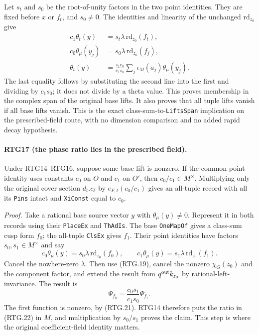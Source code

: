 Let $s_t$ and $s_0$ be the root-of-unity factors in the two point
identities.  They are fixed before $x$ or $f_t$, and $s_0\ne0$.
The identities and linearity of the unchanged $\mathrm{rd}_{z_0}$ give
\[
 \begin{split}
 c_1\theta_t(y)&=s_t\lambda\,\mathrm{rd}_{z_0}(f_t),\\
 c_0\theta_\mu(y_j)&=s_0\lambda\,\mathrm{rd}_{z_0}(f_j),\\
 \theta_t(y)&=
   \frac{s_tc_0}{c_1s_0}\sum_j\iota_M(a_j)\theta_\mu(y_j).
 \end{split}                                                  \tag{RTG.20}
\]
The last equality follows by substituting the second line into the
first and dividing by $c_1s_0$; it does not divide by a theta value.
This proves membership in the complex span of the original base lifts.
It also proves that all tuple lifts vanish if all base lifts vanish.
This is the exact class-sum-to-\texttt{LiftsSpan} implication on the
prescribed-field route, with no dimension comparison and no added rapid
decay hypothesis.

\paragraph{RTG17 (the phase ratio lies in the prescribed field).}
\label{claim:RTG17}
Under RTG14--RTG16, suppose some base lift is nonzero.  If the common
point identity uses constants $c_0$ on $O$ and $c_1$ on $O'$, then
\(c_0/c_1\in M^\times\).  Multiplying only the original cover section
$d_t.c_\delta$ by $e_{F,t}(c_0/c_1)$ gives an all-tuple record with
all its \texttt{Pins} intact and \texttt{XiConst} equal to $c_0$.

\emph{Proof.}
Take a rational base source vector $y$ with $\theta_\mu(y)\ne0$.
Represent it in both records using their \texttt{PlaceEx} and
\texttt{ThAdIs}.  The base \texttt{OneMapOf} gives a class-sum cusp
form $f_0$; the all-tuple \texttt{ClsEx} gives $f_1$.  Their point
identities have factors $s_0,s_1\in M^\times$ and say
\[
 c_0\theta_\mu(y)=s_0\lambda\,\mathrm{rd}_{z_0}(f_0),\qquad
 c_1\theta_\mu(y)=s_1\lambda\,\mathrm{rd}_{z_0}(f_1).
                                                               \tag{RTG.21}
\]
Cancel the nowhere-zero $\lambda$.  Then use (RTG.19), cancel the
nonzero $\chi_G(z_0)$ and the component factor, and extend the
result from $q^{\rm out}k_{z_0}$ by rational-left-invariance.  The
result is
\[
 \Psi_{f_0}=\frac{c_0s_1}{c_1s_0}\Psi_{f_1}.                 \tag{RTG.22}
\]
The first function is nonzero, by (RTG.21).  RTG14 therefore puts the
ratio in (RTG.22) in $M$, and multiplication by $s_0/s_1$ proves the
claim.  This step is where the original coefficient-field identity
matters.

